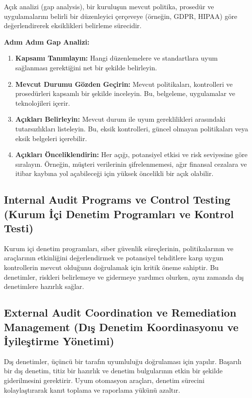 Açık analizi (gap analysis), bir kuruluşun mevcut politika, prosedür ve uygulamalarını belirli bir düzenleyici çerçeveye (örneğin, GDPR, HIPAA) göre değerlendirerek eksiklikleri belirleme sürecidir.

\textbf{Adım Adım Gap Analizi:}
\begin{enumerate}
    \item \textbf{Kapsamı Tanımlayın:} Hangi düzenlemelere ve standartlara uyum sağlanması gerektiğini net bir şekilde belirleyin.
    \item \textbf{Mevcut Durumu Gözden Geçirin:} Mevcut politikaları, kontrolleri ve prosedürleri kapsamlı bir şekilde inceleyin. Bu, belgeleme, uygulamalar ve teknolojileri içerir.
    \item \textbf{Açıkları Belirleyin:} Mevcut durum ile uyum gereklilikleri arasındaki tutarsızlıkları listeleyin. Bu, eksik kontrolleri, güncel olmayan politikaları veya eksik belgeleri içerebilir.
    \item \textbf{Açıkları Önceliklendirin:} Her açığı, potansiyel etkisi ve risk seviyesine göre sıralayın. Örneğin, müşteri verilerinin şifrelenmemesi, ağır finansal cezalara ve itibar kaybına yol açabileceği için yüksek öncelikli bir açık olabilir.
\end{enumerate}

\subsection{Internal Audit Programs ve Control Testing (Kurum İçi Denetim Programları ve Kontrol Testi)}

Kurum içi denetim programları, siber güvenlik süreçlerinin, politikalarının ve araçlarının etkinliğini değerlendirmek ve potansiyel tehditlere karşı uygun kontrollerin mevcut olduğunu doğrulamak için kritik öneme sahiptir. Bu denetimler, riskleri belirlemeye ve gidermeye yardımcı olurken, aynı zamanda dış denetimlere hazırlık sağlar.

\subsection{External Audit Coordination ve Remediation Management (Dış Denetim Koordinasyonu ve İyileştirme Yönetimi)}

Dış denetimler, üçüncü bir tarafın uyumluluğu doğrulaması için yapılır. Başarılı bir dış denetim, titiz bir hazırlık ve denetim bulgularının etkin bir şekilde giderilmesini gerektirir. Uyum otomasyon araçları, denetim sürecini kolaylaştırarak kanıt toplama ve raporlama yükünü azaltır.

